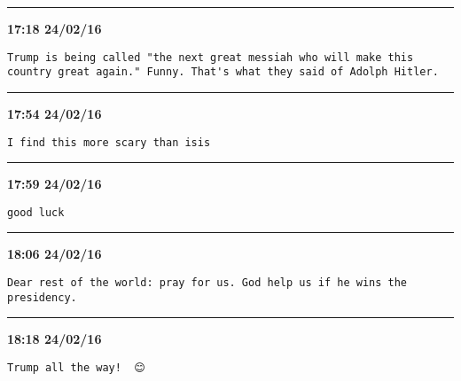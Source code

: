 \hrule%

\begin{adjustwidth}{0cm}{0cm}
\footnotesize \textbf{17:18 24/02/16}

\begin{lstlisting}[breaklines, breakatwhitespace, basicstyle=\small, frame=leftline]
Trump is being called "the next great messiah who will make this country great again." Funny. That's what they said of Adolph Hitler.
\end{lstlisting}
\end{adjustwidth}

\hrule%

\begin{adjustwidth}{0cm}{0cm}
\footnotesize \textbf{17:54 24/02/16}

\begin{lstlisting}[breaklines, breakatwhitespace, basicstyle=\small, frame=leftline]
I find this more scary than isis
\end{lstlisting}
\end{adjustwidth}

\hrule%

\begin{adjustwidth}{0cm}{0cm}
\footnotesize \textbf{17:59 24/02/16}

\begin{lstlisting}[breaklines, breakatwhitespace, basicstyle=\small, frame=leftline]
good luck
\end{lstlisting}
\end{adjustwidth}

\hrule%

\begin{adjustwidth}{0cm}{0cm}
\footnotesize \textbf{18:06 24/02/16}

\begin{lstlisting}[breaklines, breakatwhitespace, basicstyle=\small, frame=leftline]
Dear rest of the world: pray for us. God help us if he wins the presidency.
\end{lstlisting}
\end{adjustwidth}

\hrule%

\begin{adjustwidth}{0cm}{0cm}
\footnotesize \textbf{18:18 24/02/16}

\begin{lstlisting}[breaklines, breakatwhitespace, basicstyle=\small, frame=leftline]
Trump all the way!  😊
\end{lstlisting}
\end{adjustwidth}

